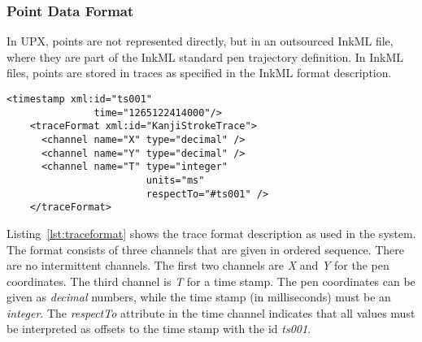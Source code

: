
\subsubsection{Point Data Format}
\label{sec:hwre:pointdataformat}

In UPX, points are not represented directly, but in an outsourced InkML file,
where they are part of the InkML standard pen trajectory definition. In InkML
files, points are stored in traces as specified in the InkML format description.
\begin{xmlcode}
  \begin{lstlisting}[emph={traceFormat,channel,timestamp},
                     emphstyle=\color{blue}\textbf,
                     emph={[2]name,type,units,respectTo,id,time},
                     emphstyle={[2]\color{red}},
                     caption={Definition of the trace format},
                     label=lst:traceformat]
    <timestamp xml:id="ts001" 
               time="1265122414000"/>
    <traceFormat xml:id="KanjiStrokeTrace">
      <channel name="X" type="decimal" />
      <channel name="Y" type="decimal" />
      <channel name="T" type="integer"
                        units="ms"
                        respectTo="#ts001" />
    </traceFormat>
  \end{lstlisting}
\end{xmlcode}
Listing~\ref{lst:traceformat} shows the trace format description as used in
the system. The format consists of three channels that are given in ordered 
sequence. There are no intermittent channels. The first two channels are \emph{X}
and \emph{Y} for the pen coordinates. The third channel is \emph{T} for a time 
stamp. The pen coordinates can be given as \emph{decimal} numbers, while the
time stamp (in milliseconds) must be an \emph{integer}.
The \emph{respectTo} attribute in the time channel indicates that all values
must be interpreted as offsets to the time stamp with the id \emph{ts001}.

